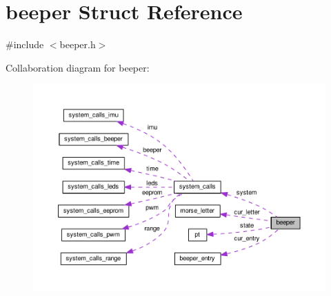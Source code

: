 \hypertarget{structbeeper}{\section{beeper Struct Reference}
\label{structbeeper}
}


{\ttfamily \#include $<$beeper.\+h$>$}



Collaboration diagram for beeper\+:
\nopagebreak
\begin{figure}[H]
\begin{center}
\leavevmode
\includegraphics[width=350pt]{structbeeper__coll__graph}
\end{center}
\end{figure}
